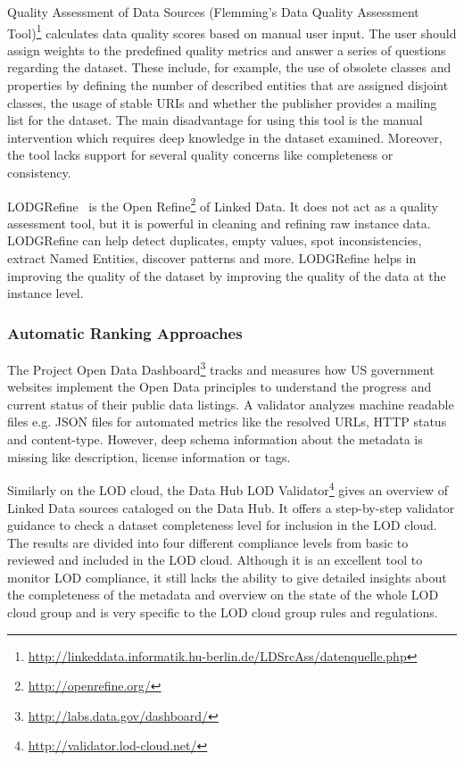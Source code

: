 Quality Assessment of Data Sources (Flemming's Data Quality Assessment Tool)\footnote{\url{http://linkeddata.informatik.hu-berlin.de/LDSrcAss/datenquelle.php}} calculates data quality scores based on manual user input. The user should assign weights to the predefined quality metrics and answer a series of questions regarding the dataset. These include, for example, the use of obsolete classes and properties by defining the number of described entities that are assigned disjoint classes, the usage of stable URIs and whether the publisher provides a mailing list for the dataset. The main disadvantage for using this tool is the manual intervention which requires deep knowledge in the dataset examined. Moreover, the tool lacks support for several quality concerns like completeness or consistency.

LODGRefine~\cite{Verlic:iSemantics:12} is the Open Refine\footnote{\url{http://openrefine.org/}} of Linked Data. It does not act as a quality assessment tool, but it is powerful in cleaning and refining raw instance data. LODGRefine can help detect duplicates, empty values, spot inconsistencies, extract Named Entities, discover patterns and more. LODGRefine helps in improving the quality of the dataset by improving the quality of the data at the instance level.

\subsubsection{Automatic Ranking Approaches}
The Project Open Data Dashboard\footnote{\url{http://labs.data.gov/dashboard/}} tracks and measures how US government websites implement the Open Data principles to understand the progress and current status of their public data listings. A validator analyzes machine readable files e.g. JSON files for automated metrics like the resolved URLs, HTTP status and content-type. However, deep schema information about the metadata is missing like description, license information or tags.

Similarly on the LOD cloud, the Data Hub LOD Validator\footnote{\url{http://validator.lod-cloud.net/}} gives an overview of Linked Data sources cataloged on the Data Hub. It offers a step-by-step validator guidance to check a dataset completeness level for inclusion in the LOD cloud. The results are divided into four different compliance levels from basic to reviewed and included in the LOD cloud. Although it is an excellent tool to monitor LOD compliance, it still lacks the ability to give detailed insights about the completeness of the metadata and overview on the state of the whole LOD cloud group and is very specific to the LOD cloud group rules and regulations.

